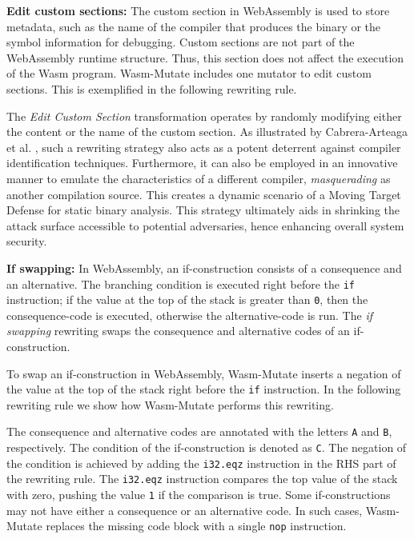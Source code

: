 \documentclass[sigplan,screen]{acmart}
\newcommand{\tool}{{\sc Wasm-Mutate}\xspace}
\begin{document}
\textbf{Edit custom sections:}
The custom section in WebAssembly is used to store metadata, such as the name of the compiler that produces the binary or the symbol information for debugging.
Custom sections are not part of the WebAssembly runtime structure.
Thus, this section does not affect the execution of the Wasm program.
\tool includes one mutator to edit custom sections. 
This is exemplified in the following rewriting rule. 



The \emph{Edit Custom Section} transformation operates by randomly modifying either the content or the name of the custom section. 
As illustrated by Cabrera-Arteaga et al. \cite{CABRERAARTEAGA2023103296}, such a rewriting strategy also acts as a potent deterrent against compiler identification techniques.
Furthermore, it can also be employed in an innovative manner to emulate the characteristics of a different compiler, \emph{masquerading} as another compilation source. 
This creates a dynamic scenario of a Moving Target Defense for static binary analysis. 
This strategy ultimately aids in shrinking the attack surface accessible to potential adversaries, hence enhancing overall system security.



\textbf{If swapping:} In WebAssembly, an if-construction consists of a consequence and an alternative. The branching condition is executed right before the \texttt{if} instruction; if the value at the top of the stack is greater than \texttt{0}, then the consequence-code is executed, otherwise the alternative-code is run.
The \emph{if swapping} rewriting swaps the consequence and alternative codes of an if-construction.


To swap an if-construction in WebAssembly, \tool inserts a negation of the value at the top of the stack right before the \texttt{if} instruction.
In the following rewriting rule we show how \tool performs this rewriting.

The consequence and alternative codes are annotated with the letters \texttt{A} and \texttt{B}, respectively.
The condition of the if-construction is denoted as \texttt{C}.
The negation of the condition is achieved by adding the \texttt{i32.eqz} instruction in the RHS part of the rewriting rule.
The \texttt{i32.eqz} instruction compares the top value of the stack with zero, pushing the value \texttt{1} if the comparison is true.
Some if-constructions may not have either a consequence or an alternative code.
In such cases, \tool replaces the missing code block with a single \texttt{nop} instruction.
\end{document}
